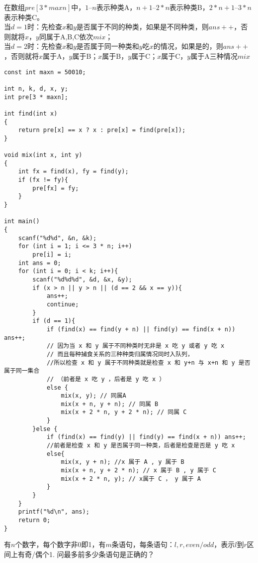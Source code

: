 在数组$pre[3*maxn]$中，$1–n$表示种类A，$n+1–2*n$表示种类B，$2*n+1–3*n$表示种类C。 \\
当$d=1$时：先检查$x$和$y$是否属于不同的种类，如果是不同种类，则$ans++$，否则就将$x$，$y$同属于A,B,C依次$mix$； \\
当$d=2$时：先检查$x$和$y$是否属于同一种类和$y$吃$x$的情况，如果是的，则$ans++$，否则就将$x$属于A，$y$属于B；$x$属于B，$y$属于C；$x$属于C，$y$属于A三种情况$mix$
\begin{lstlisting}
const int maxn = 50010;

int n, k, d, x, y;
int pre[3 * maxn];

int find(int x)
{
    return pre[x] == x ? x : pre[x] = find(pre[x]);
}

void mix(int x, int y)
{
    int fx = find(x), fy = find(y);
    if (fx != fy){
        pre[fx] = fy;
    }
}

int main()
{
    scanf("%d%d", &n, &k);
    for (int i = 1; i <= 3 * n; i++)
        pre[i] = i;
    int ans = 0;
    for (int i = 0; i < k; i++){
        scanf("%d%d%d", &d, &x, &y);
        if (x > n || y > n || (d == 2 && x == y)){
            ans++;
            continue;
        }
        if (d == 1){
            if (find(x) == find(y + n) || find(y) == find(x + n)) ans++;
            // 因为当 x 和 y 属于不同种类时无非是 x 吃 y 或者 y 吃 x
            // 而且每种捕食关系的三种种类归属情况同时入队列，
            //所以检查 x 和 y 属于不同种类就是检查 x 和 y+n 与 x+n 和 y 是否属于同一集合
            // （前者是 x 吃 y ，后者是 y 吃 x ）
            else {
                mix(x, y); // 同属A
                mix(x + n, y + n); // 同属 B
                mix(x + 2 * n, y + 2 * n); // 同属 C
            }
        }else {
            if (find(x) == find(y) || find(y) == find(x + n)) ans++;
            //前者是检查 x 和 y 是否属于同一种类，后者是检查是否是 y 吃 x
            else{
                mix(x, y + n); //x 属于 A , y 属于 B
                mix(x + n, y + 2 * n); // x 属于 B , y 属于 C
                mix(x + 2 * n, y); // x属于 C ， y 属于 A
            }
        }
    }
    printf("%d\n", ans);
    return 0;
}
\end{lstlisting}

有$n$个数字，每个数字非0即1，有$m$条语句，每条语句：$l,r,even/odd$，表示$l$到$r$区间上有奇/偶个1. 问最多前多少条语句是正确的？\\

